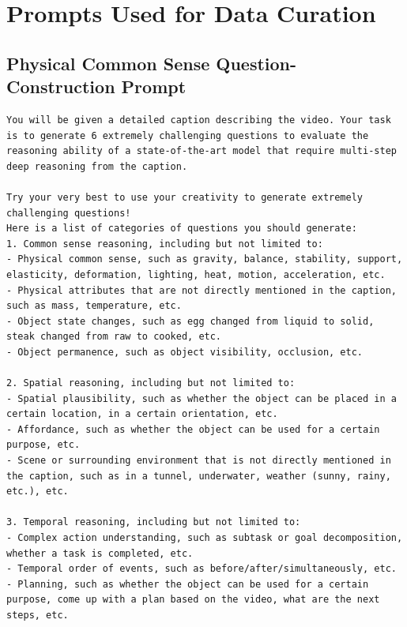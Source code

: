 \section{Prompts Used for Data Curation}
\label{sec::prompts}

\subsection{Physical Common Sense Question-Construction Prompt}

\begin{tcolorbox}[colback=nvidiagreen!3,colframe=nvidiagreen!75!white,title=\textsc{Physical Common Sense Question-Construction Prompt},left=0.5ex,right=0.5ex,top=0.5ex,bottom=0.5ex]
\fontsize{9.}{9.}\selectfont
\begin{Verbatim}[breaklines=true, breaksymbolleft={}, breaksymbolright={}]
You will be given a detailed caption describing the video. Your task is to generate 6 extremely challenging questions to evaluate the reasoning ability of a state-of-the-art model that require multi-step deep reasoning from the caption.

Try your very best to use your creativity to generate extremely challenging questions!
Here is a list of categories of questions you should generate:
1. Common sense reasoning, including but not limited to:
- Physical common sense, such as gravity, balance, stability, support, elasticity, deformation, lighting, heat, motion, acceleration, etc.
- Physical attributes that are not directly mentioned in the caption, such as mass, temperature, etc.
- Object state changes, such as egg changed from liquid to solid, steak changed from raw to cooked, etc.
- Object permanence, such as object visibility, occlusion, etc.

2. Spatial reasoning, including but not limited to:
- Spatial plausibility, such as whether the object can be placed in a certain location, in a certain orientation, etc.
- Affordance, such as whether the object can be used for a certain purpose, etc.
- Scene or surrounding environment that is not directly mentioned in the caption, such as in a tunnel, underwater, weather (sunny, rainy, etc.), etc.

3. Temporal reasoning, including but not limited to:
- Complex action understanding, such as subtask or goal decomposition, whether a task is completed, etc.
- Temporal order of events, such as before/after/simultaneously, etc.
- Planning, such as whether the object can be used for a certain purpose, come up with a plan based on the video, what are the next steps, etc.


\end{Verbatim}
\end{tcolorbox}
